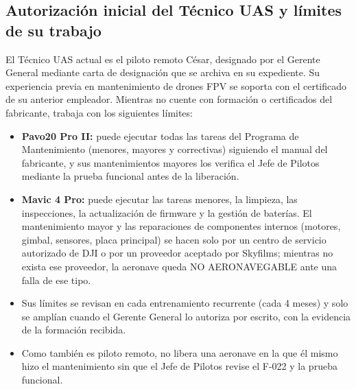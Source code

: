 \subsection{Autorización inicial del Técnico UAS y límites de su trabajo}
El Técnico UAS actual es el piloto remoto César, designado por el Gerente General mediante carta de designación que se archiva en su expediente. Su experiencia previa en mantenimiento de drones FPV se soporta con el certificado de su anterior empleador. Mientras no cuente con formación o certificados del fabricante, trabaja con los siguientes límites:
\begin{itemize}
    \item \textbf{Pavo20 Pro II:} puede ejecutar todas las tareas del Programa de Mantenimiento (menores, mayores y correctivas) siguiendo el manual del fabricante, y sus mantenimientos mayores los verifica el Jefe de Pilotos mediante la prueba funcional antes de la liberación.
    \item \textbf{Mavic 4 Pro:} puede ejecutar las tareas menores, la limpieza, las inspecciones, la actualización de firmware y la gestión de baterías. El mantenimiento mayor y las reparaciones de componentes internos (motores, gimbal, sensores, placa principal) se hacen solo por un centro de servicio autorizado de DJI o por un proveedor aceptado por Skyfilms; mientras no exista ese proveedor, la aeronave queda NO AERONAVEGABLE ante una falla de ese tipo.
    \item Sus límites se revisan en cada entrenamiento recurrente (cada 4 meses) y solo se amplían cuando el Gerente General lo autoriza por escrito, con la evidencia de la formación recibida.
    \item Como también es piloto remoto, no libera una aeronave en la que él mismo hizo el mantenimiento sin que el Jefe de Pilotos revise el F-022 y la prueba funcional.
\end{itemize}
